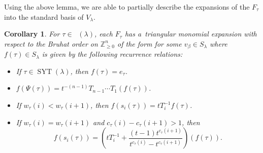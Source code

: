 \documentclass[10pt,a4paper]{amsart}
\numberwithin{equation}{section}
\newtheorem{Corollary}[Theorem]{Corollary}
\theoremstyle{definition}
\DeclareMathOperator{\SYT}{\mathrm{SYT}}
\DeclareMathOperator{\PSYT}{\mathrm{PSYT}_{\geq 0}}
\begin{document}
Using the above lemma, we are able to partially describe the expansions of the $F_{\tau}$ into the standard basis of $V_{\lambda}$.

\begin{Corollary}\label{triangular expansion}
For $\tau \in \PSYT(\lambda)$, each $F_{\tau}$ has a~triangular monomial expansion with respect to the Bruhat order on $\mathbb{Z}^n_{\geq 0}$ of the form
 for some $v_{\beta} \in S_\lambda$ where $f(\tau) \in S_\lambda$ is given by the following recurrence relations:

\begin{itemize}
\itemsep=0pt
 \item If $\tau \in \SYT(\lambda)$, then $f(\tau) = e_{\tau}$.
 \item $f(\Psi(\tau)) = t^{-(n-1)}T_{n-1}\cdots T_1(f(\tau))$.
 \item If $w_{\tau}(i) < w_{\tau}(i+1)$, then $f(s_i(\tau)) = tT_i^{-1}f(\tau)$.
 \item If $w_{\tau}(i) = w_{\tau}(i+1)$ and $c_{\tau}(i)-c_{\tau}(i+1) > 1$, then
 \[
 f(s_i(\tau)) = \left( tT_i^{-1} + \frac{(t-1)t^{c_{\tau}(i+1)}}{t^{c_{\tau}(i)} - t^{c_{\tau}(i+1)}} \right)(f(\tau)).
 \]

\end{itemize}

\end{Corollary}
\end{document}
